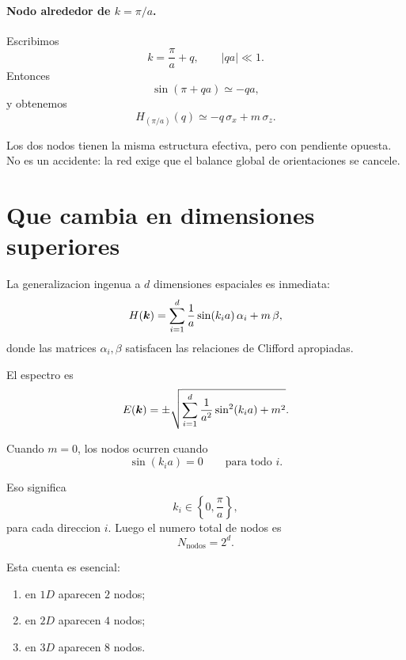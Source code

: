 \paragraph{Nodo alrededor de \(k=\pi/a\).}
Escribimos
\begin{equation}
k = \frac{\pi}{a}+q,
\qquad |qa|\ll 1.
\end{equation}
Entonces
\begin{equation}
\sin\!\left(\pi + qa\right)\simeq -qa,
\end{equation}
y obtenemos
\begin{equation}
H_{(\pi/a)}(q)\simeq -q\,\sigma_x + m\,\sigma_z.
\end{equation}

Los dos nodos tienen la misma estructura efectiva, pero con pendiente opuesta. No es un accidente: la red exige que el balance global de orientaciones se cancele.

\section{Que cambia en dimensiones superiores}

La generalizacion ingenua a \(d\) dimensiones espaciales es inmediata:
\begin{equation}
H(\bm{k})=\sum_{i=1}^{d}\frac{1}{a}\sin(k_i a)\,\alpha_i + m\,\beta,
\label{c26:eq:naive-dd}
\end{equation}
donde las matrices \(\alpha_i,\beta\) satisfacen las relaciones de Clifford apropiadas.

El espectro es
\begin{equation}
E(\bm{k})=\pm\sqrt{\sum_{i=1}^{d}\frac{1}{a^2}\sin^2(k_i a)+m^2}.
\end{equation}

Cuando \(m=0\), los nodos ocurren cuando
\begin{equation}
\sin(k_i a)=0
\qquad \text{para todo } i.
\end{equation}

Eso significa
\begin{equation}
k_i \in \left\{0,\frac{\pi}{a}\right\},
\end{equation}
para cada direccion \(i\). Luego el numero total de nodos es
\begin{equation}
N_{\text{nodos}} = 2^d.
\end{equation}

Esta cuenta es esencial:

\begin{enumerate}[leftmargin=*]
  \item en \(1D\) aparecen \(2\) nodos;
  \item en \(2D\) aparecen \(4\) nodos;
  \item en \(3D\) aparecen \(8\) nodos.
\end{enumerate}

